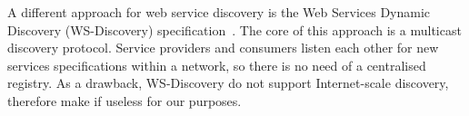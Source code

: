 A different approach for web service discovery is the Web Services Dynamic Discovery (WS-Discovery) specification~\cite{beatty2005}. The core of this approach is a multicast discovery protocol. Service providers and consumers  listen each other for new services specifications within a network, so there is no need of a centralised registry. As a drawback, WS-Discovery do not support Internet-scale discovery, therefore make if useless for our purposes.
